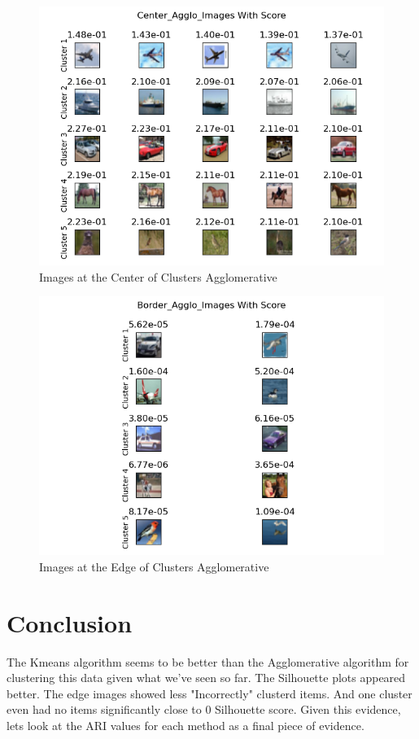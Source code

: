 \documentclass[12pt]{article}
\begin{document}
\begin{figure}
  \includegraphics{../results/agglo/Center_Agglo_images.png}
  \caption{Images at the Center of Clusters Agglomerative}
  \label{figure8}
\end{figure}
\begin{figure}
  \includegraphics{../results/agglo/Border_Agglo_images.png}
  \caption{Images at the Edge of Clusters Agglomerative}
  \label{figure9}
\end{figure}

\section{Conclusion}
The Kmeans algorithm seems to be better than the Agglomerative algorithm for clustering this data given what we've 
seen so far. The Silhouette plots appeared better. The edge images showed less "Incorrectly" clusterd items. And one 
cluster even had no items significantly close to 0 Silhouette score. Given this evidence, lets look at the ARI values for
each method as a final piece of evidence.
\end{document}
